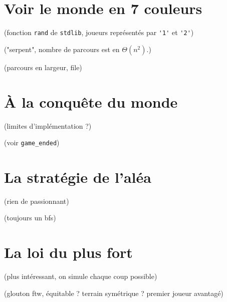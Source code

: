 \documentclass[12pt,L,fira-sans]{paper}
\begin{document}
\section{Voir le monde en 7 couleurs}

\begin{qu}
	(fonction \verb|rand| de \verb|stdlib|, joueurs représentés par \verb|'1'| et \verb|'2'|)
\end{qu}

\begin{qu}
	("serpent", nombre de parcours est en \(\Theta(n^2)\).)
\end{qu}

\begin{qu}
	(parcours en largeur, file)
\end{qu}

\section{À la conquête du monde}

\begin{qu}
	(limites d'implémentation ?)
\end{qu}

\begin{qu}
	(voir \verb|game_ended|)
\end{qu}

\section{La stratégie de l'aléa}

\begin{qu}
	(rien de passionnant)
\end{qu}

\begin{qu}
	(toujours un bfs)
\end{qu}

\section{La loi du plus fort}

\begin{qu}
	(plus intéressant, on simule chaque coup possible)
\end{qu}

\begin{qu}
	(glouton ftw, équitable ? terrain symétrique ? premier joueur avantagé)
\end{qu}
\end{document}
